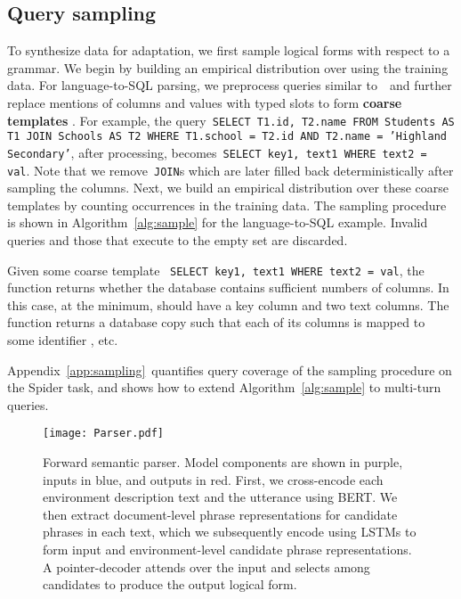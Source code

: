 \documentclass[11pt,a4paper]{article}
\begin{document}
\subsection{Query sampling}
\label{sec:sampling}

To synthesize data for adaptation, we first sample logical forms  with respect to a grammar.
We begin by building an empirical distribution over  using the training data.
For language-to-SQL parsing, we preprocess queries similar to~\citet{zhang2019editing}~and further replace mentions of columns and values with typed slots to form \textbf{coarse templates} .
For example, the query~\texttt{SELECT T1.id, T2.name FROM Students AS T1 JOIN Schools AS T2 WHERE T1.school = T2.id AND T2.name = 'Highland Secondary'}, after processing, becomes~\texttt{SELECT key1, text1 WHERE text2 = val}.
Note that we remove~\texttt{JOIN}s which are later filled back deterministically after sampling the columns.
Next, we build an empirical distribution  over these coarse templates by counting occurrences in the training data.
The sampling procedure is shown in Algorithm~\ref{alg:sample} for the language-to-SQL example.
Invalid queries and those that execute to the empty set are discarded.

Given some coarse template ~\texttt{SELECT key1, text1 WHERE text2 = val}, the function  returns whether the database  contains sufficient numbers of columns.
In this case, at the minimum,  should have a key column and two text columns.
The function  returns a database copy  such that each of its columns is mapped to some identifier ,  etc.

Appendix~\ref{app:sampling}~quantifies query coverage of the sampling procedure on the Spider task, and shows how to extend Algorithm~\ref{alg:sample} to multi-turn queries.


\begin{figure*}[t]
    \centering
    \texttt{[image: Parser.pdf]}
    \caption{
    Forward semantic parser.
    Model components are shown in purple, inputs in blue, and outputs in red.
    First, we cross-encode each environment description text and the utterance using BERT.
    We then extract document-level phrase representations for candidate phrases in each text, which we subsequently encode using LSTMs to form input and environment-level candidate phrase representations.
    A pointer-decoder attends over the input and selects among candidates to produce the output logical form.
    }
    \vspace{-0.15in}
    \label{fig:forward}
\end{figure*}
\end{document}
